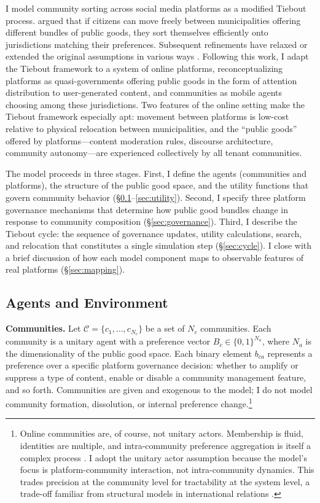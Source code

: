 \documentclass{article}
\begin{document}
I model community sorting across social media platforms as a modified Tiebout process. \cite{tiebout1956pure} argued that if citizens can move freely between municipalities offering different bundles of public goods, they sort themselves efficiently onto jurisdictions matching their preferences. Subsequent refinements have relaxed or extended the original assumptions in various ways \citep{bewley1981critique, wooders1994large, konishi1996voting}. Following this work, I adapt the Tiebout framework to a system of online platforms, reconceptualizing platforms as quasi-governments offering public goods in the form of attention distribution to user-generated content, and communities as mobile agents choosing among these jurisdictions. Two features of the online setting make the Tiebout framework especially apt: movement between platforms is low-cost relative to physical relocation between municipalities, and the ``public goods'' offered by platforms---content moderation rules, discourse architecture, community autonomy---are experienced collectively by all tenant communities.

The model proceeds in three stages. First, I define the agents (communities and platforms), the structure of the public good space, and the utility functions that govern community behavior (\S\ref{sec:agents}--\ref{sec:utility}). Second, I specify three platform governance mechanisms that determine how public good bundles change in response to community composition (\S\ref{sec:governance}). Third, I describe the Tiebout cycle: the sequence of governance updates, utility calculations, search, and relocation that constitutes a single simulation step (\S\ref{sec:cycle}). I close with a brief discussion of how each model component maps to observable features of real platforms (\S\ref{sec:mapping}).

\subsection{Agents and Environment}
\label{sec:agents}

\textbf{Communities.} Let $\mathcal{C} = \{c_1, \ldots, c_{N_c}\}$ be a set of $N_c$ communities. Each community is a unitary agent with a preference vector $B_c \in \{0,1\}^{N_a}$, where $N_a$ is the dimensionality of the public good space. Each binary element $b_{ca}$ represents a preference over a specific platform governance decision: whether to amplify or suppress a type of content, enable or disable a community management feature, and so forth. Communities are given and exogenous to the model; I do not model community formation, dissolution, or internal preference change.\footnote{Online communities are, of course, not unitary actors. Membership is fluid, identities are multiple, and intra-community preference aggregation is itself a complex process \citep{stryker2004integrating, stets2000identity}. I adopt the unitary actor assumption because the model's focus is platform-community interaction, not intra-community dynamics. This trades precision at the community level for tractability at the system level, a trade-off familiar from structural models in international relations \citep{waltzEvaluatingTheories1997}.}
\end{document}
